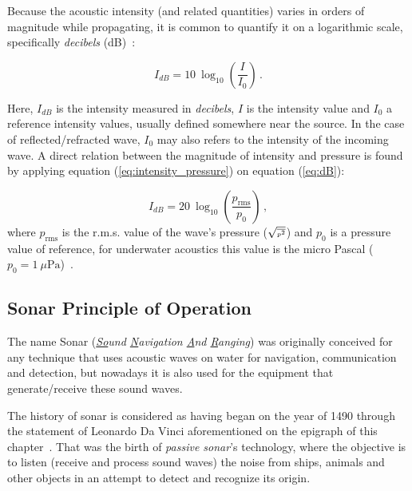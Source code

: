 

Because the acoustic intensity (and related quantities) varies in orders of
magnitude while propagating, it is common to quantify it on a logarithmic scale,
specifically \textit{decibels} (dB)~\cite{LURTON}:

\begin{equation}\label{eq:dB}
I_{dB} = 10~\log_{10}\left(\frac{I}{I_0}\right)\,.
\end{equation} 

Here, $I_{dB}$ is the intensity measured in \textit{decibels}, $I$ is the
intensity value and $I_0$ a reference intensity values, usually defined somewhere near the
source. In the case of reflected/refracted wave, $I_0$ may also refers to
the intensity of the incoming wave. A direct relation between the magnitude of
intensity and pressure is found by applying equation
(\ref{eq:intensity_pressure}) on equation (\ref{eq:dB}):

\begin{equation}\label{eq:dB2}
I_{dB} = 20~\log_{10}\left(\frac{p_{\text{rms}}}{p_0}\right)\,,
\end{equation}
%
where $p_{\text{rms}}$ is the r.m.s. value of the wave's pressure ({\small $\sqrt{\text{\tiny \(\overline{p^2}\)}}$}) and $p_0$ is
a pressure value of reference, for underwater acoustics this value is the
micro Pascal (\(p_0 = 1~\mu\text{Pa} \))~\cite{LURTON}.


\subsection{Sonar Principle of Operation}

The name Sonar (\textit{\underline{So}und \underline{N}avigation \underline{A}nd
\underline{R}anging}) was originally conceived for any technique that uses
acoustic waves on water for navigation, communication and detection, but
nowadays it is also used for the equipment that generate/receive these
sound waves.

The history of sonar is considered as having began on the year of 1490 through
the statement of Leonardo Da Vinci aforementioned on the epigraph 
of this chapter~\cite{fahy1998fundamentals}. That was the birth of
\textit{passive sonar}'s technology, where the objective is to listen (receive
and process sound waves) the noise from ships, animals and other objects in an
attempt to detect and recognize its origin. 

